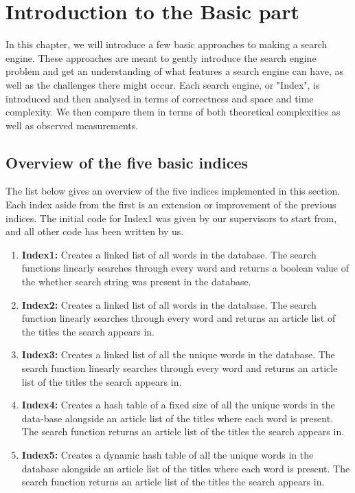\section{Introduction to the Basic part}

In this chapter, we will introduce a few basic approaches to making a search engine. These approaches are meant to gently introduce the search engine problem and get an understanding of what features a search engine can have, as well as the challenges there might occur. Each search engine, or "Index", is introduced and then analysed in terms of correctness and space and time complexity. We then compare them in terms of both theoretical complexities as well as observed measurements. 

\subsection{Overview of the five basic indices}

The list below gives an overview of the five indices implemented in this section. Each index aside from the first is an extension or improvement of the previous indices. The initial code for Index1 was given by our supervisors to start from, and all other code has been written by us. 

\begin{enumerate}
    \item[] \textbf{Index1:} Creates a linked list of all words in the database. The search functions linearly searches through every word and returns a boolean value of the whether search string was present in the database.
    \item[] \textbf{Index2:} Creates a linked list of all words in the database. The search function linearly searches through every word and returns an article list of the titles the search appears in. 
    \item[] \textbf{Index3:} Creates a linked list of all the unique words in the database. The search function linearly searches through every word and returns an article list of the titles the search appears in.
    \item[] \textbf{Index4:} Creates a hash table of a fixed size of all the unique words in the data-base alongside an article list of the titles where each word is present. The search function returns an article list of the titles the search appears in.
    \item[] \textbf{Index5:} Creates a dynamic hash table of all the unique words in the database alongside an article list of the titles where each word is present. The search function returns an article list of the titles the search appears in.
\end{enumerate}




